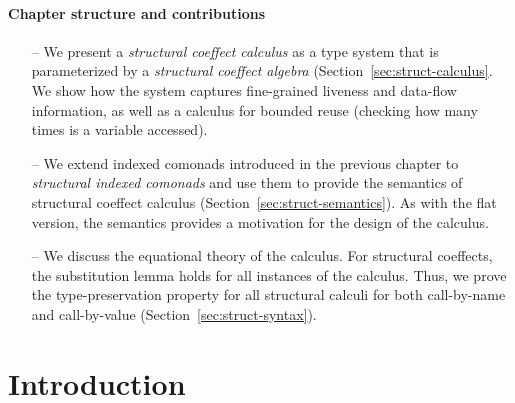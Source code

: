 \paragraph{Chapter structure and contributions}
\begin{itemize}
\item[--] We present a \emph{structural coeffect calculus} as a type system that is parameterized 
  by a \emph{structural coeffect algebra} (Section~\ref{sec:struct-calculus}. We show how the 
  system captures fine-grained liveness and data-flow information, as well as a calculus for bounded 
  reuse (checking how many times is a variable accessed).

\item[--] We extend indexed comonads introduced in the previous chapter to 
  \emph{structural indexed comonads} and use them to provide the semantics of structural 
  coeffect calculus (Section~\ref{sec:struct-semantics}). As with the flat version, the
  semantics provides a motivation for the design of the calculus.

\item[--] We discuss the equational theory of the calculus. For structural coeffects, the substitution 
  lemma holds for all instances of the calculus. Thus, we prove the type-preservation property 
  for all structural calculi for both call-by-name and call-by-value (Section~\ref{sec:struct-syntax}). 
\end{itemize}

%                                                                                      
%                                                                                     

\section{Introduction}
\label{sec:structural-intro}

